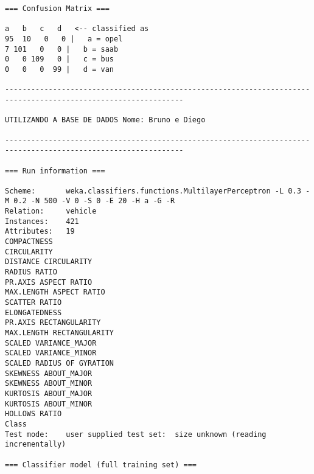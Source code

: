 \documentclass[
	article,			%
	11pt,				%
	oneside,			%
	a4paper,			%
	english,			%
	brazil,				%
	sumario=tradicional
	]{abntex2}
\begin{document}
\begin{lstlisting}
=== Confusion Matrix ===

a   b   c   d   <-- classified as
95  10   0   0 |   a = opel
7 101   0   0 |   b = saab
0   0 109   0 |   c = bus
0   0   0  99 |   d = van

---------------------------------------------------------------------------------------------------------------

UTILIZANDO A BASE DE DADOS Nome: Bruno e Diego

---------------------------------------------------------------------------------------------------------------

=== Run information ===

Scheme:       weka.classifiers.functions.MultilayerPerceptron -L 0.3 -M 0.2 -N 500 -V 0 -S 0 -E 20 -H a -G -R
Relation:     vehicle
Instances:    421
Attributes:   19
COMPACTNESS
CIRCULARITY
DISTANCE CIRCULARITY
RADIUS RATIO
PR.AXIS ASPECT RATIO
MAX.LENGTH ASPECT RATIO
SCATTER RATIO
ELONGATEDNESS
PR.AXIS RECTANGULARITY
MAX.LENGTH RECTANGULARITY
SCALED VARIANCE_MAJOR
SCALED VARIANCE_MINOR
SCALED RADIUS OF GYRATION
SKEWNESS ABOUT_MAJOR
SKEWNESS ABOUT_MINOR
KURTOSIS ABOUT_MAJOR
KURTOSIS ABOUT_MINOR
HOLLOWS RATIO
Class
Test mode:    user supplied test set:  size unknown (reading incrementally)

=== Classifier model (full training set) ===


\end{lstlisting}
\end{document}
